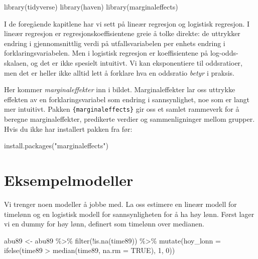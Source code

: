 \documentclass[
  norsk,
  letterpaper,
  DIV=11,
  numbers=noendperiod]{scrreprt}
\newenvironment{Shaded}{\begin{snugshade}}{\end{snugshade}}
\newcommand{\AttributeTok}[1]{\textcolor[rgb]{0.40,0.45,0.13}{#1}}
\newcommand{\ConstantTok}[1]{\textcolor[rgb]{0.56,0.35,0.01}{#1}}
\newcommand{\DecValTok}[1]{\textcolor[rgb]{0.68,0.00,0.00}{#1}}
\newcommand{\FunctionTok}[1]{\textcolor[rgb]{0.28,0.35,0.67}{#1}}
\newcommand{\NormalTok}[1]{\textcolor[rgb]{0.00,0.23,0.31}{#1}}
\newcommand{\OtherTok}[1]{\textcolor[rgb]{0.00,0.23,0.31}{#1}}
\newcommand{\SpecialCharTok}[1]{\textcolor[rgb]{0.37,0.37,0.37}{#1}}
\newcommand{\StringTok}[1]{\textcolor[rgb]{0.13,0.47,0.30}{#1}}
\theoremstyle{definition}
\theoremstyle{remark}
\begin{document}
\begin{Shaded}
\begin{Highlighting}[]
\FunctionTok{library}\NormalTok{(tidyverse)}
\FunctionTok{library}\NormalTok{(haven)}
\FunctionTok{library}\NormalTok{(marginaleffects)}
\end{Highlighting}
\end{Shaded}

I de foregående kapitlene har vi sett på lineær regresjon og logistisk
regresjon. I lineær regresjon er regresjonskoeffisientene greie å tolke
direkte: de uttrykker endring i gjennomsnittlig verdi på
utfallsvariabelen per enhets endring i forklaringsvariabelen. Men i
logistisk regresjon er koeffisientene på log-odds-skalaen, og det er
ikke spesielt intuitivt. Vi kan eksponentiere til oddsratioer, men det
er heller ikke alltid lett å forklare hva en oddsratio \emph{betyr} i
praksis.

Her kommer \emph{marginaleffekter} inn i bildet. Marginaleffekter lar
oss uttrykke effekten av en forklaringsvariabel som endring i
sannsynlighet, noe som er langt mer intuitivt. Pakken
\texttt{\{marginaleffects\}} gir oss et samlet rammeverk for å beregne
marginaleffekter, predikerte verdier og sammenligninger mellom grupper.
Hvis du ikke har installert pakken fra før:

\begin{Shaded}
\begin{Highlighting}[]
\FunctionTok{install.packages}\NormalTok{(}\StringTok{"marginaleffects"}\NormalTok{)}
\end{Highlighting}
\end{Shaded}

\section{Eksempelmodeller}\label{eksempelmodeller}

Vi trenger noen modeller å jobbe med. La oss estimere en lineær modell
for timelønn og en logistisk modell for sannsynligheten for å ha høy
lønn. Først lager vi en dummy for høy lønn, definert som timelønn over
medianen.

\begin{Shaded}
\begin{Highlighting}[]
\NormalTok{abu89 }\OtherTok{\textless{}{-}}\NormalTok{ abu89 }\SpecialCharTok{\%\textgreater{}\%}
  \FunctionTok{filter}\NormalTok{(}\SpecialCharTok{!}\FunctionTok{is.na}\NormalTok{(time89)) }\SpecialCharTok{\%\textgreater{}\%}
  \FunctionTok{mutate}\NormalTok{(}\AttributeTok{hoy\_lonn =} \FunctionTok{ifelse}\NormalTok{(time89 }\SpecialCharTok{\textgreater{}} \FunctionTok{median}\NormalTok{(time89, }\AttributeTok{na.rm =} \ConstantTok{TRUE}\NormalTok{), }\DecValTok{1}\NormalTok{, }\DecValTok{0}\NormalTok{))}
\end{Highlighting}
\end{Shaded}
\end{document}
